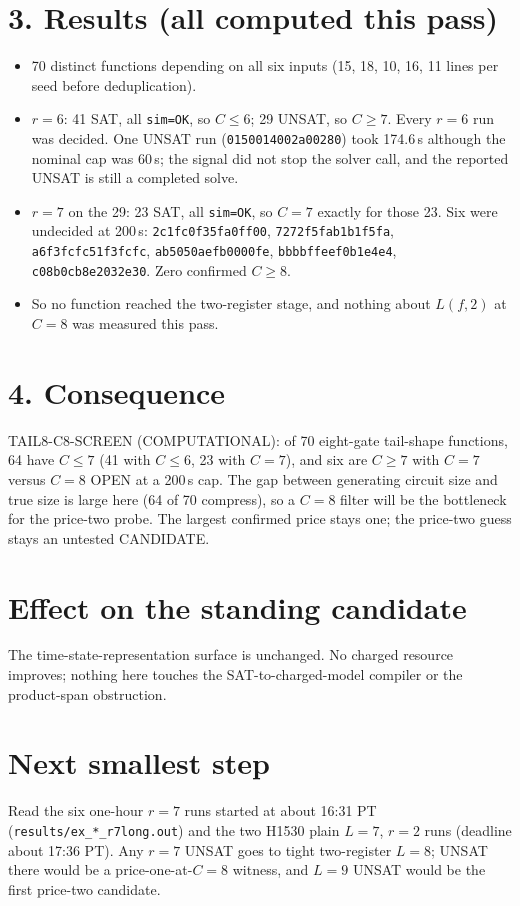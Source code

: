 \documentclass[11pt]{article}
\begin{document}
\section*{3. Results (all computed this pass)}
\begin{itemize}
\item 70 distinct functions depending on all six inputs (15, 18, 10, 16, 11 lines per seed before deduplication).
\item $r=6$: 41 SAT, all \texttt{sim=OK}, so $C\le6$; 29 UNSAT, so $C\ge7$. Every $r=6$ run was decided. One UNSAT run (\texttt{0150014002a00280}) took 174.6\,s although the nominal cap was 60\,s; the signal did not stop the solver call, and the reported UNSAT is still a completed solve.
\item $r=7$ on the 29: 23 SAT, all \texttt{sim=OK}, so $C=7$ exactly for those 23. Six were undecided at 200\,s: \texttt{2c1fc0f35fa0ff00}, \texttt{7272f5fab1b1f5fa}, \texttt{a6f3fcfc51f3fcfc}, \texttt{ab5050aefb0000fe}, \texttt{bbbbffeef0b1e4e4}, \texttt{c08b0cb8e2032e30}. Zero confirmed $C\ge8$.
\item So no function reached the two-register stage, and nothing about $L(f,2)$ at $C=8$ was measured this pass.
\end{itemize}

\section*{4. Consequence}
TAIL8-C8-SCREEN (COMPUTATIONAL): of 70 eight-gate tail-shape functions, 64 have $C\le7$ (41 with $C\le6$, 23 with $C=7$), and six are $C\ge7$ with $C=7$ versus $C=8$ OPEN at a 200\,s cap. The gap between generating circuit size and true size is large here (64 of 70 compress), so a $C=8$ filter will be the bottleneck for the price-two probe. The largest confirmed price stays one; the price-two guess stays an untested CANDIDATE.

\section*{Effect on the standing candidate}
The time-state-representation surface is unchanged. No charged resource improves; nothing here touches the SAT-to-charged-model compiler or the product-span obstruction.

\section*{Next smallest step}
Read the six one-hour $r=7$ runs started at about 16:31 PT (\texttt{results/ex\_*\_r7long.out}) and the two H1530 plain $L=7$, $r=2$ runs (deadline about 17:36 PT). Any $r=7$ UNSAT goes to tight two-register $L=8$; UNSAT there would be a price-one-at-$C=8$ witness, and $L=9$ UNSAT would be the first price-two candidate.
\end{document}

